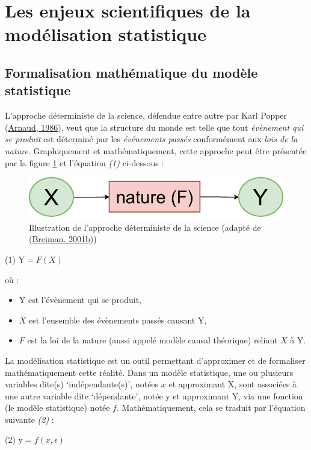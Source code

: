 \documentclass[12pt,twoside]{reedthesis}
\providecommand{\tightlist}{%
  \setlength{\itemsep}{0pt}\setlength{\parskip}{0pt}}
\begin{document}
\hypertarget{statistical-modeling}{%
\section{Les enjeux scientifiques de la modélisation statistique}\label{statistical-modeling}}

\hypertarget{formalisation-mathuxe9matique-du-moduxe8le-statistique}{%
\subsection{Formalisation mathématique du modèle statistique}\label{formalisation-mathuxe9matique-du-moduxe8le-statistique}}

L'approche déterministe de la science, défendue entre autre par Karl Popper (\protect\hyperlink{ref-arnaud_karl_1986}{Arnaud, 1986}), veut que la structure du monde est telle que tout \emph{évènement qui se produit} est déterminé par les \emph{événements passés} conformément aux \emph{lois de la nature}. Graphiquement et mathématiquement, cette approche peut être présentée par la figure \ref{fig:x-nature-y} et l'équation \emph{(1)} ci-dessous :
\begin{figure}

{\centering \includegraphics[width=0.5\linewidth]{figure/x_nature_y} 

}

\caption[Illustration de l'approche déterministe de la science ]{Illustration de l'approche déterministe de la science (adapté de (\protect\hyperlink{ref-breiman_statistical_2001}{Breiman, 2001b}))}\label{fig:x-nature-y}
\end{figure}
\begin{center}
(1)         $\mathrm{Y} = {F}(X)$ 
\end{center}
où :
\begin{itemize}
\tightlist
\item
  Y est l'évènement qui se produit,
\item
  \(X\) est l'ensemble des évènements passés causant Y,
\item
  \(F\) est la loi de la nature (aussi appelé modèle causal théorique) reliant \(X\) à Y.\\
\end{itemize}
La modélisation statistique est un outil permettant d'approximer et de formaliser mathématiquement cette réalité. Dans un modèle statistique, une ou plusieurs variables dite(s) `indépendante(s)', notées \(x\) et approximant X, sont associées à une autre variable dite `dépendante', notée y et approximant Y, via une fonction (le modèle statistique) notée \(f\). Mathématiquement, cela se traduit par l'équation suivante \emph{(2)} :\\
\begin{center}
(2)        $\mathrm{y} = {f}(x, \epsilon)$
\end{center}
\hfill\break
\end{document}
